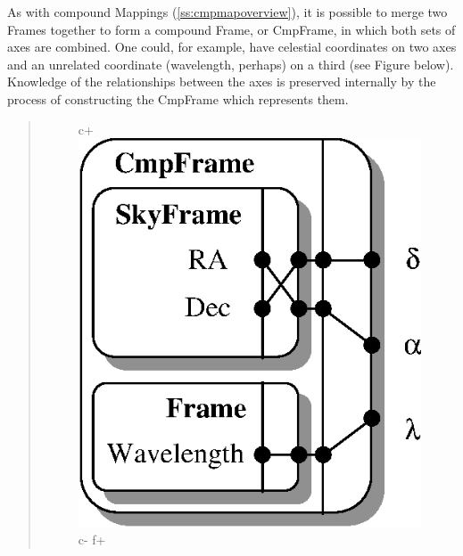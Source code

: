 \documentclass[twoside,11pt]{article}
\newcommand{\secref}[1]{\S\ref{#1}}
\renewcommand{\secref}[1]{\ref{#1}}
\begin{document}
\begin{htmlonly}
   As with compound Mappings (\secref{ss:cmpmapoverview}), it is possible
   to merge two Frames together to form a compound Frame, or CmpFrame, in
   which both sets of axes are combined.  One could, for example, have
   celestial coordinates on two axes and an unrelated coordinate
   (wavelength, perhaps) on a third (see Figure below).  Knowledge of the
   relationships between the axes is preserved internally by the process
   of constructing the CmpFrame which represents them.
   \begin{quote}
   \begin{figure}
   \label{fig:cmpframe}
c+
   \includegraphics[scale=1.5]{sun211_figures/cmpframe.eps}
c-
f+

\end{figure}
\end{quote}
\end{htmlonly}
\end{document}
